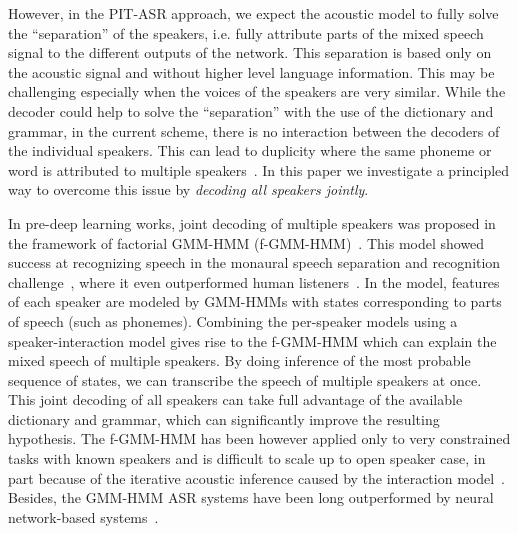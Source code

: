 \documentclass[a4paper]{article}
\begin{document}
However, in the PIT-ASR approach, we expect the acoustic model to fully solve the ``separation'' of the speakers, i.e. fully attribute parts of the mixed speech signal to the different outputs of the network. This separation is based only on the acoustic signal and without higher level language information. This may be challenging especially when the voices of the speakers are very similar. While the decoder could help to solve the ``separation'' with the use of the dictionary and grammar, in the current scheme, there is no interaction between the decoders of the individual speakers. This can lead to duplicity where the same phoneme or word is attributed to multiple speakers~\cite{kanda2018hitachi}. In this paper we investigate a principled way to overcome this issue by \textit{decoding all speakers jointly}.

In pre-deep learning works, joint decoding of multiple speakers was proposed in the framework of factorial GMM-HMM (f-GMM-HMM)~\cite{Rennie2010}. This model showed success at recognizing speech in the monaural speech separation and recognition challenge~\cite{cooke2010monaural}, where it even outperformed human listeners~\cite{hershey2010super}. In the model, features of each speaker are modeled by GMM-HMMs with states corresponding to parts of speech (such as phonemes). Combining the per-speaker models using a speaker-interaction model gives rise to the f-GMM-HMM which can explain the mixed speech of multiple speakers. By doing inference of the most probable sequence of states, we can transcribe the speech of multiple speakers at once. This joint decoding of all speakers can take full advantage of the available dictionary and grammar, which can significantly improve the resulting hypothesis. The f-GMM-HMM has been however applied only to very constrained tasks with known speakers and is difficult to scale up to open speaker case, in part because of the iterative acoustic inference caused by the interaction model~\cite{Rennie2010}. Besides, the GMM-HMM ASR systems have been long outperformed by neural network-based systems~\cite{hinton2012deep,QIAN20181}.
\end{document}
